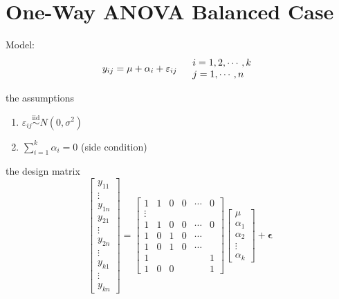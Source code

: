 \documentclass{article}
\begin{document}
\section{One-Way ANOVA Balanced Case}

Model:%
\begin{equation*}
y_{ij}=\mu +\alpha _{i}+\varepsilon _{ij}\quad 
\begin{tabular}{l}
$i=1,2,\cdots ,k$ \\ 
$j=1,\cdots ,n$%
\end{tabular}%
\end{equation*}

the assumptions

\begin{enumerate}
\item $\varepsilon _{ij}\overset{\text{iid}}{\sim }N\left( 0,\sigma
^{2}\right) $

\item $\sum\limits_{i=1}^{k}\alpha _{i}=0$ (side condition)
\end{enumerate}

\bigskip 

the design matrix%
\begin{equation*}
\left[ 
\begin{array}{c}
y_{11} \\ 
\vdots  \\ 
y_{1n} \\ 
y_{21} \\ 
\vdots  \\ 
y_{2n} \\ 
\vdots  \\ 
y_{k1} \\ 
\vdots  \\ 
y_{kn}%
\end{array}%
\right] =\left[ 
\begin{array}{cccccc}
1 & 1 & 0 & 0 & \cdots  & 0 \\ 
\vdots  &  &  &  &  &  \\ 
1 & 1 & 0 & 0 & \cdots  & 0 \\ 
1 & 0 & 1 & 0 & \cdots  &  \\ 
1 & 0 & 1 & 0 & \cdots  &  \\ 
1 &  &  &  &  & 1 \\ 
1 & 0 & 0 &  &  & 1%
\end{array}%
\right] \left[ 
\begin{array}{c}
\mu  \\ 
\alpha _{1} \\ 
\alpha _{2} \\ 
\vdots  \\ 
\alpha _{k}%
\end{array}%
\right] +\mathbf{\epsilon }
\end{equation*}
\end{document}
